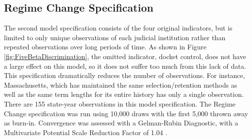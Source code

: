 \documentclass[12pt]{article}
\begin{document}
\subsection{Regime Change Specification}
The second model specification consists of the four original indicators, but is limited to only unique observations of each judicial institution rather than repeated observations over long periods of time.  As shown in Figure \ref{fig:FiveBetaDiscrimination}, the omitted indicator, docket control, does not have a large effect on this model, so it does not suffer too much from this lack of data.  This specification dramatically reduces the number of observations.  For instance, Massachusetts, which has maintained the same selection/retention methods as well as the same term lengths for its entire history has only a single observation.  There are 155 state-year observations in this model specification.  The Regime Change specification was run using 10,000 draws with the first 5,000 thrown away as burn-in.  Convergence was assessed with a Gelman-Rubin Diagnostic, with a Multivariate Potential Scale Reduction Factor of 1.04 \citep{Gelman1992}.  
\end{document}

